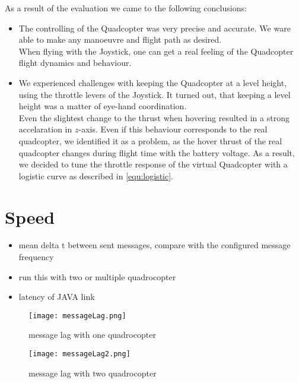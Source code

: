 As a result of the evaluation we came to the following conclusions:

\begin{itemize}
\item{The controlling of the Quadcopter was very precise and accurate. We ware able to make any manoeuvre and flight path as desired. \\ When flying with the Joystick, one can get a real feeling
of the Quadcopter flight dynamics and behaviour}.

\item{We experienced challenges with keeping the Quadcopter at a level height, using the throttle levers of the Joystick. It turned out, that keeping a level height was a matter of eye-hand coordination. \\
Even the slightest change to the thrust when hovering resulted in a strong accelaration in $z$-axis. Even if this behaviour corresponds to the real quadcopter, we identified it as a problem, as the hover thrust of the real quadcopter changes during flight time with the battery voltage. As a result, we decided to tune the throttle response of the virtual Quadcopter with a logistic curve as described in \ref{equ:logistic}}.

\end{itemize}

\section{Speed}


\begin{itemize}

\item{mean delta t between sent messages, compare with the configured message frequency}
\item{ run this with two or multiple quadrocopter}
\item{latency of JAVA link}
\end{itemize}

\begin{figure}[h!]
 \begin{center}
  \texttt{[image: messageLag.png]}
 \end{center}
  \caption{message lag with one quadrocopter\label{fig:messageLag}}
\end{figure}

\begin{figure}[h!]
 \begin{center}
  \texttt{[image: messageLag2.png]}
 \end{center}
  \caption{message lag with two quadrocopter\label{fig:messageLag2}}
\end{figure}


